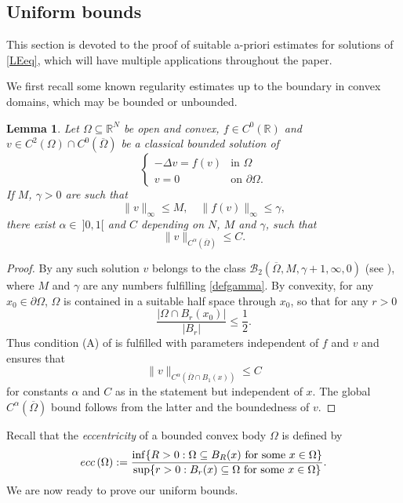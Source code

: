 \documentclass[12pt]{amsart}
\numberwithin{equation}{section}
\theoremstyle{plain}
\newtheorem{lemma}[theorem]{Lemma}
\theoremstyle{plain}
\theoremstyle{plain}
\theoremstyle{definition}
\newcommand{\R}{{\mathbb R}}
\newcommand{\beq}{\begin{equation}}
\newcommand{\eeq}{\end{equation}}
\renewcommand{\le}{\leqslant}
\newcommand{\cal}{\mathcal}
\begin{document}
\subsection{Uniform bounds} 

This section is devoted to the proof of suitable a-priori estimates for solutions of \eqref{LEeq}, which will have multiple applications throughout the paper.

We first recall some known regularity estimates up to the boundary in convex domains, which may be bounded or unbounded.
\begin{lemma}
\label{regbconv}
Let $\Omega\subseteq \R^N$ be open and convex, $f\in C^{0}(\R)$
and $v\in C^2(\Omega)\cap C^0(\overline{\Omega})$ be a classical bounded solution of
\[
\begin{cases}
-\Delta v= f(v)&\text{in $\Omega$}\\
v=0&\text{on $\partial\Omega$}.
\end{cases}
\]
If $M$, $\gamma>0$ are such that 
\beq
\label{defgamma}
\|v\|_\infty \leq M, \quad \|f(v)\|_{\infty} \leq \gamma,
\eeq
 there exist $\alpha\in \ ]0, 1[$ and $C$ depending on $N$, $M$ and $\gamma$, such that 
$$\|v\|_{C^\alpha(\overline{\Omega})}\le C.$$
\end{lemma}

\begin{proof}
By \cite[Ch.\,3, Lemma 14.1]{LaUr68} any such solution $v$ belongs to the class ${\cal B}_2(\overline{\Omega}, M, \gamma+1, \infty, 0)$ (see \cite[Ch.\,2, Sec.\,7]{LaUr68}), where $M$ and $\gamma$ are any numbers fulfilling \eqref{defgamma}.
By convexity, for any $x_0\in \partial\Omega$, $\Omega$ is contained in a suitable half space through $x_0$, so that for any $r>0$
\[
\frac{|\Omega\cap B_r(x_0)|}{|B_r|}\le \frac{1}{2}.
\]
Thus condition (A) of \cite[p.\,6]{LaUr68} is fulfilled with parameters independent of $f$ and $v$ and \cite[Ch.\,2, Theorem 7.1]{LaUr68} ensures that 
\[
\|v\|_{C^\alpha(\overline{\Omega}\cap B_1(x))}\le C
\]
for constants $\alpha$ and $C$ as in the statement but independent of $x$. 
The global $C^\alpha(\overline{\Omega})$ bound follows from the latter and the boundedness of $v$.
\end{proof}
 
Recall that the {\em eccentricity} of a bounded convex body $\Omega$ is defined by 
\[
{\rm ecc}\, (\Omega):=\frac{\inf\{ R>0: \Omega\subseteq B_R(x) \hbox{ for some $x \in \Omega$\}}}{\sup\{r>0: B_r(x)\subseteq \Omega \hbox{ for some $x \in \Omega$}\}}.
\]
We are now ready to prove our uniform bounds. 
\end{document}
